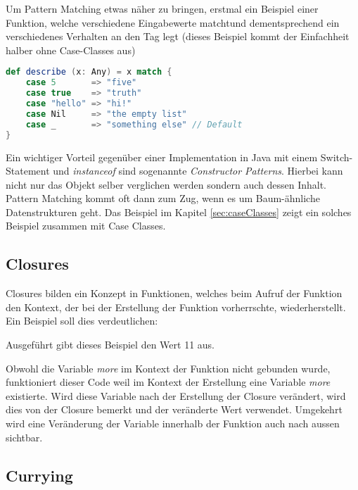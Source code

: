 Um Pattern Matching etwas näher zu bringen, erstmal ein Beispiel einer
Funktion, welche verschiedene Eingabewerte \glqq matcht\grqq und dementsprechend
ein verschiedenes Verhalten an den Tag legt (dieses Beispiel kommt der 
Einfachheit halber ohne Case-Classes aus)

\begin{lstlisting}[float=ht,language=scala,caption=Pattern Matching auf Literale \cite{odersky},label=lst:patternMatching]
def describe (x: Any) = x match {
	case 5       => "five"
	case true    => "truth"
	case "hello" => "hi!"
	case Nil     => "the empty list"
	case _       => "something else" // Default
}
\end{lstlisting}

Ein wichtiger Vorteil gegenüber einer Implementation in Java mit
einem Switch-Statement und \emph{instanceof} sind sogenannte 
\emph{Constructor Patterns}. Hierbei kann nicht nur das Objekt selber
verglichen werden sondern auch dessen Inhalt. \\

Pattern Matching kommt oft dann zum Zug, wenn es um Baum-ähnliche
Datenstrukturen geht. Das Beispiel im Kapitel \ref{sec:caseClasses} zeigt ein solches
Beispiel zusammen mit Case Classes.

\subsection{Closures}

Closures bilden ein Konzept in Funktionen, welches beim Aufruf der 
Funktion den Kontext, der bei der Erstellung der Funktion vorherrschte,
wiederherstellt. \\

Ein Beispiel soll dies verdeutlichen:



Ausgeführt gibt dieses Beispiel den Wert 11 aus.

Obwohl die Variable \emph{more} im Kontext der Funktion nicht gebunden
wurde, funktioniert dieser Code weil im Kontext der Erstellung eine
Variable \emph{more} existierte. Wird diese Variable nach der
Erstellung der Closure verändert, wird dies von der Closure bemerkt und 
der veränderte Wert verwendet. Umgekehrt wird eine Veränderung der
Variable innerhalb der Funktion auch nach aussen sichtbar.

\subsection{Currying}

